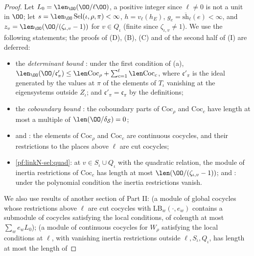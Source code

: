 \begin{proof}
Let $L_0=\len_\OO(\OO/\ell\OO)$, a positive integer since $\ell\ne0$ is not a unit in $\OO$; let $s=\len_\OO\linkNselSel(\iota,\rho,\pi)<\infty$,
$h=v_\ell(h_E)$, $g_e=\overline{\mathrm{sh}}_\ell(e)<\infty$, and $z_v=\len_\OO(\OO/(\zeta_{\iota,v}-1))$ for $v\in Q_\iota$ (finite since $\zeta_{\iota,v}\ne1$).
We use the following statements; the proofs of (D), (B), (C) and of the second half of (I) are deferred:
\begin{itemize}
\item[(D)] the \emph{determinant bound} : under the first condition of (a),
$\len_\OO(\OO/\mathfrak c'_\pi)\le\len\mathrm{Coc}_\rho+\sum_{c=1}^t\len\mathrm{Coc}_c$, where $\mathfrak c'_\pi$ is the ideal generated by the
values at $\pi$ of the elements of $T_\iota$ vanishing at the eigensystems outside $Z_\iota$; and $\mathfrak c'_\pi=\mathfrak c_\pi$ by the
definitions;
\item[(B)] the \emph{coboundary bound} : the coboundary parts of $\mathrm{Coc}_\rho$
and $\mathrm{Coc}_c$ have length at most a multiple of $\len(\OO/\delta_{\mathcal S})=0$;
\item[(C)]  and
: the elements of $\mathrm{Coc}_\rho$ and $\mathrm{Coc}_c$ are continuous cocycles,
and their restrictions to the places above $\ell$ are cut cocycles;
\item[(I)] \cref{pf:linkN-sel:quad}: at $v\in S_\iota\cup Q_\iota$ with the quadratic relation, the module of inertia restrictions of $\mathrm{Coc}_c$
has length at most $\len(\OO/(\zeta_{\iota,v}-1))$; and : under the
polynomial condition the inertia restrictions vanish.
\end{itemize}
We also use results of another section of Part II:  (a module of global cocycles
whose restrictions above $\ell$ are cut cocycles with $\mathrm{LB}_w(\cdot,e_w)$ contains a submodule of cocycles satisfying the local conditions,
of colength at most $\sum_we_wL_0$);  (a module of continuous cocycles for
$W_\rho$ satisfying the local conditions at $\ell$, with vanishing inertia restrictions outside $\ell,S_\iota,Q_\iota$, has length at most the length of

\end{proof}
